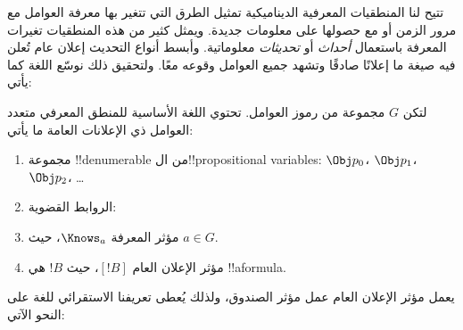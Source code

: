 \documentclass[../../../include/open-logic-section]{subfiles}
\begin{document}


تتيح لنا المنطقيات المعرفية الديناميكية تمثيل الطرق التي تتغير بها
معرفة العوامل مع مرور الزمن أو مع حصولها على معلومات جديدة. ويمثل
كثير من هذه المنطقيات تغيرات المعرفة باستعمال \emph{أحداث} أو
\emph{تحديثات} معلوماتية. وأبسط أنواع التحديث إعلان عام تُعلن فيه صيغة
ما إعلانًا صادقًا وتشهد جميع العوامل وقوعه معًا. ولتحقيق ذلك نوسّع
اللغة كما يأتي:

\begin{defn}
لتكن $G$ مجموعة من رموز العوامل. تحتوي اللغة الأساسية للمنطق المعرفي
متعدد العوامل ذي الإعلانات العامة ما يأتي:
\begin{enumerate}
  \item مجموعة !!{denumerable} من ال!!{propositional variable}s:
    $\Obj p_0$، $\Obj p_1$، $\Obj p_2$، \dots
  \item الروابط القضوية: \startycommalist
  \item مؤثر المعرفة $\Knows_a$، حيث $a \in G$.
  \item مؤثر الإعلان العام $[!B]$، حيث $!B$ هي !!a{formula}.
\end{enumerate}
\end{defn}

يعمل مؤثر الإعلان العام عمل مؤثر الصندوق، ولذلك يُعطى تعريفنا
الاستقرائي للغة على النحو الآتي:
\end{document}

